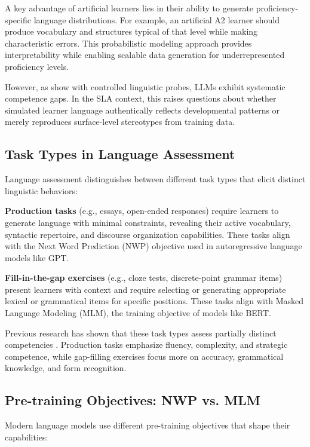 A key advantage of artificial learners lies in their ability to generate proficiency-specific language distributions. For example, an artificial A2 learner should produce vocabulary and structures typical of that level while making characteristic errors. This probabilistic modeling approach provides interpretability while enabling scalable data generation for underrepresented proficiency levels.

However, as \citet{warstadt2020blimp} show with controlled linguistic probes, LLMs exhibit systematic competence gaps. In the SLA context, this raises questions about whether simulated learner language authentically reflects developmental patterns or merely reproduces surface-level stereotypes from training data.

\subsection{Task Types in Language Assessment}

Language assessment distinguishes between different task types that elicit distinct linguistic behaviors:

\textbf{Production tasks} (e.g., essays, open-ended responses) require learners to generate language with minimal constraints, revealing their active vocabulary, syntactic repertoire, and discourse organization capabilities. These tasks align with the Next Word Prediction (NWP) objective used in autoregressive language models like GPT.

\textbf{Fill-in-the-gap exercises} (e.g., cloze tests, discrete-point grammar items) present learners with context and require selecting or generating appropriate lexical or grammatical items for specific positions. These tasks align with Masked Language Modeling (MLM), the training objective of models like BERT.

Previous research has shown that these task types assess partially distinct competencies \cite{yaneva2019systematic}. Production tasks emphasize fluency, complexity, and strategic competence, while gap-filling exercises focus more on accuracy, grammatical knowledge, and form recognition.

\subsection{Pre-training Objectives: NWP vs. MLM}

Modern language models use different pre-training objectives that shape their capabilities:

